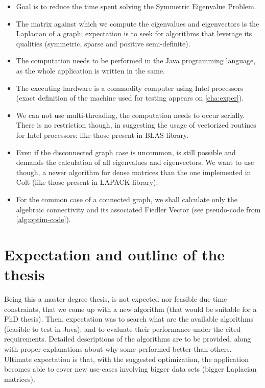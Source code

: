 \begin{itemize}
  \item Goal is to reduce the time spent solving the Symmetric Eigenvalue
    Problem. 
  \item The matrix against which we compute the eigenvalues and
    eigenvectors is the Laplacian of a graph; expectation is to seek
    for algorithms that leverage its qualities (symmetric, sparse and
    positive semi-definite). 
  \item The computation needs to be performed in the Java programming
    language, as the whole application is written in the same. 
  \item The executing hardware is a commodity computer using Intel
    processors (exact definition of the machine used for testing
    appears on \cref{cha:exper}).
  \item We can not use multi-threading, the computation needs to occur
    serially. There is no restriction
    though, in suggesting the usage of vectorized routines for Intel
    processors; like those present in BLAS library. 
  \item Even if the disconnected graph case is uncommon, is
    still possible and demands the calculation of all eigenvalues and
    eigenvectors. We want to use though, a newer algorithm for dense
    matrices than the one implemented in Colt (like those present in
    LAPACK library). 
  \item For the common case of a connected graph, we shall calculate
    only the algebraic connectivity and its associated Fiedler
    Vector (see pseudo-code from  \cref{alg:optim-code}).
\end{itemize}
\hfill

\section{Expectation and outline of the thesis}
Being this a master degree thesis, is not expected nor feasible due
time constraints, that we come up with a new algorithm (that would be
suitable for a PhD thesis). Then, expectation was to search what are
the available algorithms (feasible to test in Java); and to evaluate
their performance under the cited requirements. Detailed descriptions
of the algorithms are to be provided, along with proper explanations about
why some performed better than others. Ultimate expectation is that,
with the suggested optimization, the application becomes able to cover
new use-cases involving bigger data sets (bigger Laplacian
matrices). \\

